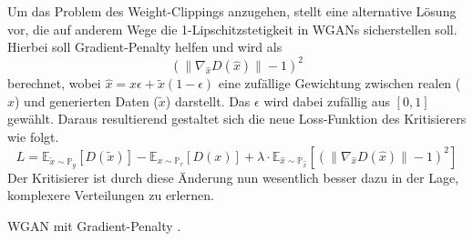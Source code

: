 Um das Problem des Weight-Clippings anzugehen, stellt
\cite{gulrajani2017improved} eine alternative Lösung vor, die auf anderem Wege
die 1-Lipschitzstetigkeit in WGANs sicherstellen soll. Hierbei soll
Gradient-Penalty helfen und wird als
\[
(\|\nabla_{\hat{x}} D(\hat{x})\| - 1)^2
\]
berechnet, wobei $\hat{x} =  x \epsilon + \tilde{x}(1 - \epsilon)$ eine
zufällige Gewichtung zwischen realen ($x$) und generierten Daten ($\tilde{x}$)
darstellt. Das $\epsilon$ wird dabei zufällig aus $\left[0, 1\right]$ gewählt.
Daraus resultierend gestaltet sich die neue Loss-Funktion des Kritisierers wie
folgt.
\[
L = \mathbb{E}_{\tilde{x} \sim \mathbb{P}_g}\left[D(\tilde{x})\right] -
    \mathbb{E}_{x \sim \mathbb{P}_r}\left[D(x)\right] +
    \lambda \cdot \mathbb{E}_{\hat{x} \sim \mathbb{P}_{\hat{x}}}\left[(\|\nabla_{\hat{x}} D(\hat{x})\| - 1)^2\right]
\]
Der Kritisierer ist durch diese Änderung nun wesentlich besser dazu in der
Lage, komplexere Verteilungen zu erlernen.

\begin{algorithm}
\caption{WGAN mit Gradient-Penalty \cite{gulrajani2017improved}.}
\BlankLine
{}
\end{algorithm}

